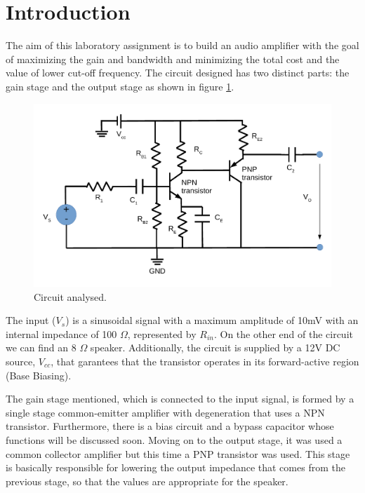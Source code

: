 \clearpage

\vspace{-0.25cm}
\section{Introduction}
\label{sec:introduction}

The aim of this laboratory assignment is to build an audio amplifier with the goal
of maximizing the gain and bandwidth and minimizing the total cost and the value of lower cut-off frequency.
The circuit designed has two distinct parts: the gain stage and the output stage as shown in figure \ref{fig:circuito}.

\begin{figure}[h] \centering
    \includegraphics[scale=0.7]{lab4_principal.pdf}
    \caption{Circuit analysed.}
    \label{fig:circuito}
\end{figure}

The input ($V_{s}$) is a sinusoidal signal with a maximum amplitude of 10mV with an internal impedance of 100 $\Omega$, represented by $R_{in}$.
On the other end of the circuit we can find an 8 $\Omega$ speaker. Additionally, the circuit is supplied
by a 12V DC source, $V_{cc}$, that garantees that the transistor operates in its forward-active region (Base Biasing).

The gain stage mentioned, which is connected to the input signal, is formed by a single stage common-emitter amplifier
with degeneration that uses a NPN transistor. Furthermore, there is a bias circuit and a bypass capacitor whose
functions will be discussed soon.
Moving on to the output stage, it was used a common collector amplifier but this time a PNP transistor was used.
This stage is basically responsible for lowering the output impedance that comes from the previous stage,
so that the values are appropriate for the speaker.

